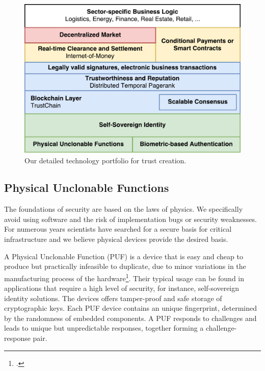\documentclass[USenglish]{article}
\begin{document}
\begin{figure}[t]
	\centering
	\includegraphics[width=1\columnwidth]{assets/tech_stack}
	\caption{Our detailed technology portfolio for trust creation.}
	\label{fig:tech_stack}
\end{figure}

\subsection{Physical Unclonable Functions}

The foundations of security are based on the laws of physics.
We specifically avoid using software and the risk of implementation bugs or security weaknesses.
For numerous years scientists have searched for a secure basis for critical infrastructure and we believe physical devices provide the desired basis.

A Physical Unclonable Function (PUF) is a device that is easy and cheap to produce but practically infeasible to duplicate, due to minor variations in the manufacturing process of the hardware\footcite{cortez2012modeling}.
Their typical usage can be found in applications that require a high level of security, for instance, self-sovereign identity solutions.
The devices offers tamper-proof and safe storage of cryptographic keys.
Each PUF device contains an unique fingerprint, determined by the randomness of embedded components.
A PUF responds to challenges and leads to unique but unpredictable responses, together forming a challenge-response pair.
\end{document}
